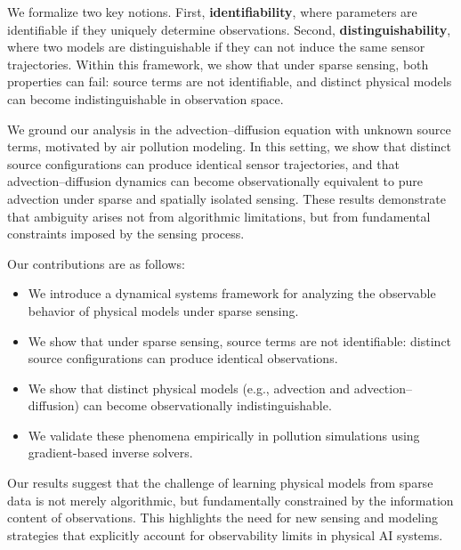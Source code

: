 We formalize two key notions. First, \textbf{identifiability}, where parameters are identifiable if they uniquely determine observations. Second, \textbf{distinguishability}, where two models are distinguishable if they can not induce the same sensor trajectories. Within this framework, we show that under sparse sensing, both properties can fail: source terms are not identifiable, and distinct physical models can become indistinguishable in observation space.

We ground our analysis in the advection--diffusion equation with unknown source terms, motivated by air pollution modeling. In this setting, we show that distinct source configurations can produce identical sensor trajectories, and that advection--diffusion dynamics can become observationally equivalent to pure advection under sparse and spatially isolated sensing. These results demonstrate that ambiguity arises not from algorithmic limitations, but from fundamental constraints imposed by the sensing process.

Our contributions are as follows:
\begin{itemize}[itemsep=0pt,topsep=0pt,leftmargin=*]
    \item We introduce a dynamical systems framework for analyzing the observable behavior of physical models under sparse sensing.
    \item We show that under sparse sensing, source terms are not identifiable: distinct source configurations can produce identical observations.
    \item We show that distinct physical models (e.g., advection and advection--diffusion) can become observationally indistinguishable.
    \item We validate these phenomena empirically in pollution simulations using gradient-based inverse solvers.
\end{itemize}

Our results suggest that the challenge of learning physical models from sparse data is not merely algorithmic, but fundamentally constrained by the information content of observations. This highlights the need for new sensing and modeling strategies that explicitly account for observability limits in physical AI systems.






